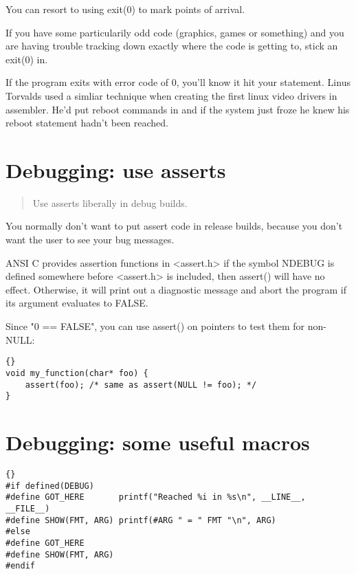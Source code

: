 \documentclass{report}
\begin{document}
You can resort to using exit(0) to mark points of arrival. 

If you have some particularily odd code (graphics, games or something) and you are having trouble tracking down exactly where the code is getting to, stick an exit(0) in. 

If the program exits with error code of 0, you'll know it hit your statement. 
Linus Torvalds used a simliar technique when creating the first linux video drivers in assembler. He'd put reboot commands in and if the system just froze he knew his reboot statement hadn't been reached. 


\section{Debugging: use asserts}
\begin{quote}
Use asserts liberally in debug builds.
\end{quote}
You normally don't want to put assert code in release builds, because you don't want the user to see your bug messages.

ANSI C provides assertion functions in <assert.h> if the symbol NDEBUG is defined somewhere before <assert.h> is included, then assert() will have no effect. Otherwise, it will print out a diagnostic message and abort the program if its argument evaluates to FALSE.

Since "0 == FALSE", you can use assert() on pointers to test them for non-NULL: 
\begin{lstlisting}{}
void my_function(char* foo) { 
    assert(foo); /* same as assert(NULL != foo); */
}
\end{lstlisting}


\section{Debugging: some useful macros}

\begin{lstlisting}{}
#if defined(DEBUG)
#define GOT_HERE       printf("Reached %i in %s\n", __LINE__, __FILE__)
#define SHOW(FMT, ARG) printf(#ARG " = " FMT "\n", ARG)
#else
#define GOT_HERE
#define SHOW(FMT, ARG)
#endif
\end{lstlisting}

\end{document}
